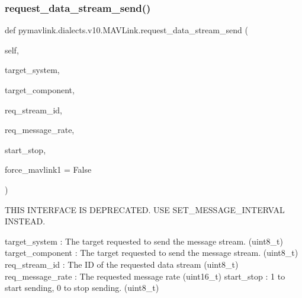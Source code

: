 \begin{DoxyVerb}
\begin{DoxyVerb}
\begin{DoxyVerb}
\begin{DoxyVerb}
\begin{DoxyVerb}
\begin{DoxyVerb}
\begin{DoxyVerb}
\begin{DoxyVerb}
\begin{DoxyVerb}
\begin{DoxyVerb}
\subsubsection{\texorpdfstring{request\+\_\+data\+\_\+stream\+\_\+send()}{request\_data\_stream\_send()}}
{\footnotesize\ttfamily def pymavlink.\+dialects.\+v10.\+M\+A\+V\+Link.\+request\+\_\+data\+\_\+stream\+\_\+send (\begin{DoxyParamCaption}\item[{}]{self,  }\item[{}]{target\+\_\+system,  }\item[{}]{target\+\_\+component,  }\item[{}]{req\+\_\+stream\+\_\+id,  }\item[{}]{req\+\_\+message\+\_\+rate,  }\item[{}]{start\+\_\+stop,  }\item[{}]{force\+\_\+mavlink1 = {\ttfamily False} }\end{DoxyParamCaption})}

\begin{DoxyVerb}THIS INTERFACE IS DEPRECATED. USE SET_MESSAGE_INTERVAL INSTEAD.

target_system             : The target requested to send the message stream. (uint8_t)
target_component          : The target requested to send the message stream. (uint8_t)
req_stream_id             : The ID of the requested data stream (uint8_t)
req_message_rate          : The requested message rate (uint16_t)
start_stop                : 1 to start sending, 0 to stop sending. (uint8_t)\end{DoxyVerb}
 \mbox{\label{classpymavlink_1_1dialects_1_1v10_1_1MAVLink_af9f6a3855ae39f97a12a04a528c093c6}} 

\end{DoxyVerb}
\end{DoxyVerb}
\end{DoxyVerb}
\end{DoxyVerb}
\end{DoxyVerb}
\end{DoxyVerb}
\end{DoxyVerb}
\end{DoxyVerb}
\end{DoxyVerb}
\end{DoxyVerb}
